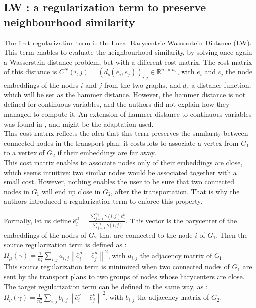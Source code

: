 \documentclass[a4paper,11pt]{article}
\begin{document}
\subsection{LW : a regularization term to preserve neighbourhood similarity}
\label{LW}
The first regularization term is the Local Barycentric Wasserstein Distance (LW). 
This term enables to evaluate the neighbourhood similarity, by solving once again a Wasserstein distance problem, but with a different cost matrix.
The cost matrix of this distance is $C^N(i,j) = (d_s(e_i, e_j))_{i,j} \in \mathbb{R}^{n_1 \times n_2}$, with $e_i$ and $e_j$ the node embeddings of the nodes $i$ and $j$ from the two graphs, and $d_s$ a distance function, which will be set as the hammer distance. 
However, the hammer distance is not defined for continuous variables, and the authors did not explain how they managed to compute it.
An extension of hammer distance to continuous variables was found in \cite{labib2019hamming}, and might be the adaptation used.\\ 
This cost matrix reflects the idea that this term preserves the similarity between connected nodes in the transport plan: it costs lots to associate a vertex from $G_1$ to a vertex of $G_2$ if their embeddings are far away.\\
This cost matrix enables to associate nodes only of their embeddings are close, which seems intuitive: two similar nodes would be associated together with a small cost.
However, nothing enables the user to be sure that two connected nodes in $G_1$ will end up close in $G_2$, after the transportation. 
That is why the authors introduced a regularization term to enforce this property.

Formally, let us define $ \hat{e}_i^\mu = \frac{\sum_{j=1}^{n_2} \gamma(i,j)e_j^{\nu}}{\sum_{j=1}^{n_2} \gamma(i,j)}$. 
This vector is the barycenter of the embeddings of the nodes of $G_2$ that are connected to the node $i$ of $G_1$.
Then the source regularization term is defined as : \\

$\Omega_\mu(\gamma) = \frac{1}{n_1^2} \sum_{i,j} a_{i,j} \left\lVert \hat{e}_i^\mu - \hat{e}_j^\mu\right\rVert ^2 $, with $a_{i,j}$ the adjacency matrix of $G_1$.\\


This source regularization term is minimized when two connected nodes of $G_1$ are sent by the transport plans to two groups of nodes whose barycenters are close.\\
The target regularization term can be defined in the same way, as : $\Omega_\nu(\gamma) = \frac{1}{n_2^2} \sum_{i,j} b_{i,j} \left\lVert \hat{e}_i^\nu - \hat{e}_j^\nu\right\rVert ^2 $, with $b_{i,j}$ the adjacency matrix of $G_2$.
\end{document}

